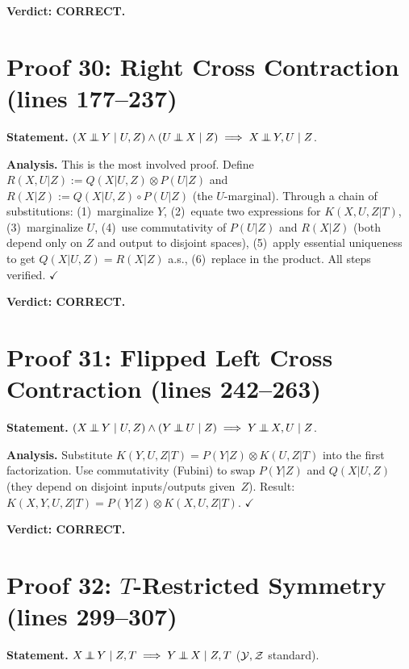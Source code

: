 \documentclass{article}
\begin{document}
\textbf{Verdict: CORRECT.}

\section{Proof 30: Right Cross Contraction (lines 177--237)}

\textbf{Statement.}
$(X\operatorname*{\perp\mkern-11mu\perp} Y\mid U,Z)\land(U\operatorname*{\perp\mkern-11mu\perp} X\mid Z)\implies X\operatorname*{\perp\mkern-11mu\perp} Y,U\mid Z$.

\textbf{Analysis.}
This is the most involved proof.
Define $R(X,U|Z):=Q(X|U,Z)\otimes P(U|Z)$ and $R(X|Z):=Q(X|U,Z)\circ P(U|Z)$
(the $U$-marginal).  Through a chain of substitutions:
(1)~marginalize $Y$, (2)~equate two expressions for $K(X,U,Z|T)$,
(3)~marginalize $U$, (4)~use commutativity of $P(U|Z)$ and $R(X|Z)$
(both depend only on $Z$ and output to disjoint spaces),
(5)~apply essential uniqueness to get $Q(X|U,Z)=R(X|Z)$ a.s.,
(6)~replace in the product.
All steps verified.  $\checkmark$

\textbf{Verdict: CORRECT.}

\section{Proof 31: Flipped Left Cross Contraction (lines 242--263)}

\textbf{Statement.}
$(X\operatorname*{\perp\mkern-11mu\perp} Y\mid U,Z)\land(Y\operatorname*{\perp\mkern-11mu\perp} U\mid Z)\implies Y\operatorname*{\perp\mkern-11mu\perp} X,U\mid Z$.

\textbf{Analysis.}
Substitute $K(Y,U,Z|T)=P(Y|Z)\otimes K(U,Z|T)$ into the first factorization.
Use commutativity (Fubini) to swap $P(Y|Z)$ and $Q(X|U,Z)$
(they depend on disjoint inputs/outputs given~$Z$).
Result: $K(X,Y,U,Z|T)=P(Y|Z)\otimes K(X,U,Z|T)$.  $\checkmark$

\textbf{Verdict: CORRECT.}

\section{Proof 32: $T$-Restricted Symmetry (lines 299--307)}

\textbf{Statement.}
$X\operatorname*{\perp\mkern-11mu\perp} Y\mid Z,T \implies Y\operatorname*{\perp\mkern-11mu\perp} X\mid Z,T$ ($\mathcal{Y},\mathcal{Z}$ standard).
\end{document}
